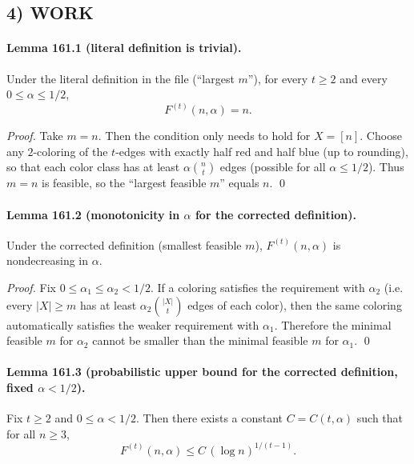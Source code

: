 \subsection*{4) WORK}
\paragraph{Lemma 161.1 (literal definition is trivial).}
Under the literal definition in the file (``largest $m$''), for every $t\ge 2$ and every $0\le \alpha\le 1/2$,
\[
F^{(t)}(n,\alpha)=n.
\]

\textit{Proof.}
Take $m=n$. Then the condition only needs to hold for $X=[n]$. Choose any $2$-coloring of the $t$-edges with exactly half red and half blue (up to rounding), so that each color class has at least $\alpha\binom{n}{t}$ edges (possible for all $\alpha\le 1/2$).
Thus $m=n$ is feasible, so the ``largest feasible $m$'' equals $n$. \qed

\paragraph{Lemma 161.2 (monotonicity in $\alpha$ for the corrected definition).}
Under the corrected definition (smallest feasible $m$), $F^{(t)}(n,\alpha)$ is nondecreasing in $\alpha$.

\textit{Proof.}
Fix $0\le \alpha_1\le \alpha_2<1/2$. If a coloring satisfies the requirement with $\alpha_2$ (i.e. every $|X|\ge m$ has at least $\alpha_2\binom{|X|}{t}$ edges of each color), then the same coloring automatically satisfies the weaker requirement with $\alpha_1$.
Therefore the minimal feasible $m$ for $\alpha_2$ cannot be smaller than the minimal feasible $m$ for $\alpha_1$. \qed

\paragraph{Lemma 161.3 (probabilistic upper bound for the corrected definition, fixed $\alpha<1/2$).}
Fix $t\ge 2$ and $0\le \alpha<1/2$. Then there exists a constant $C=C(t,\alpha)$ such that for all $n\ge 3$,
\[
F^{(t)}(n,\alpha)\le C\,(\log n)^{1/(t-1)}.
\]

